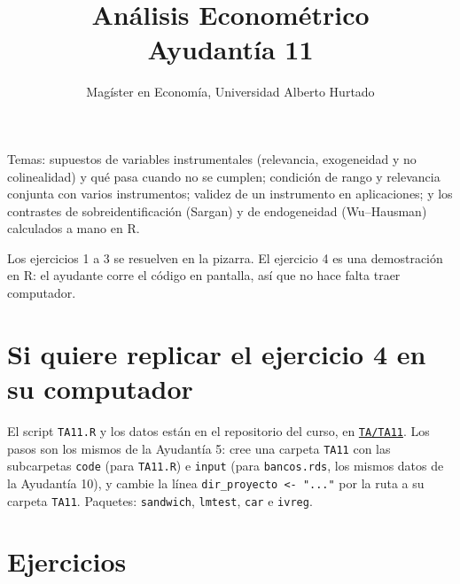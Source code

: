 \documentclass[letterpaper,11pt]{article}
\title{Análisis Econométrico \\ Ayudantía 11}
\author{Magíster en Economía, Universidad Alberto Hurtado}
\date{}
\begin{document}
\maketitle

\noindent Temas: supuestos de variables instrumentales (relevancia, exogeneidad y
no colinealidad) y qué pasa cuando no se cumplen; condición de rango y relevancia conjunta con
varios instrumentos; validez de un instrumento en aplicaciones; y los contrastes de
sobreidentificación (Sargan) y de endogeneidad (Wu--Hausman) calculados a mano en R.

\medskip
\noindent Los ejercicios 1 a 3 se resuelven en la pizarra. El ejercicio 4 es una demostración en
R: el ayudante corre el código en pantalla, así que no hace falta traer computador.

\section*{Si quiere replicar el ejercicio 4 en su computador}

\noindent El script \texttt{TA11.R} y los datos están en el repositorio del curso, en
\href{https://github.com/ramirode/econometria_mae/tree/main/TA/TA11}{\texttt{TA/TA11}}. Los pasos
son los mismos de la Ayudantía 5: cree una carpeta \texttt{TA11} con las subcarpetas
\texttt{code} (para \texttt{TA11.R}) e \texttt{input} (para \texttt{bancos.rds}, los mismos datos
de la Ayudantía 10), y cambie la línea \texttt{dir\_proyecto <- "..."} por la ruta a su carpeta
\texttt{TA11}. Paquetes: \texttt{sandwich}, \texttt{lmtest}, \texttt{car} e \texttt{ivreg}.

\section*{Ejercicios}
\end{document}
